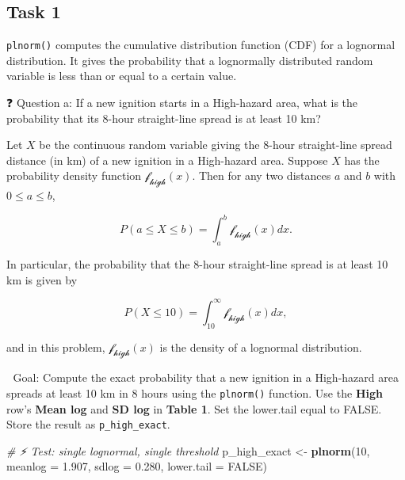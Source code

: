 \documentclass[
  12pt,
]{scrreprt}
\newenvironment{Shaded}{\begin{snugshade}}{\end{snugshade}}
\newcommand{\AttributeTok}[1]{\textcolor[rgb]{0.13,0.29,0.53}{#1}}
\newcommand{\CommentTok}[1]{\textcolor[rgb]{0.56,0.35,0.01}{\textit{#1}}}
\newcommand{\ConstantTok}[1]{\textcolor[rgb]{0.56,0.35,0.01}{#1}}
\newcommand{\DecValTok}[1]{\textcolor[rgb]{0.00,0.00,0.81}{#1}}
\newcommand{\FloatTok}[1]{\textcolor[rgb]{0.00,0.00,0.81}{#1}}
\newcommand{\FunctionTok}[1]{\textcolor[rgb]{0.13,0.29,0.53}{\textbf{#1}}}
\newcommand{\NormalTok}[1]{#1}
\newcommand{\OtherTok}[1]{\textcolor[rgb]{0.56,0.35,0.01}{#1}}
\begin{document}
\subsection{Task 1}\label{task-1-1}

\texttt{plnorm()} computes the cumulative distribution function (CDF) for a lognormal distribution. It gives the probability that a lognormally distributed random variable is less than or equal to a certain value.

❓ Question a: If a new ignition starts in a High-hazard area, what is the probability that its 8-hour straight-line spread is at least 10 km?

\begin{customtextbox}

Let $X$ be the continuous random variable giving the 8-hour straight-line spread distance (in km) of a new ignition in a High-hazard area. Suppose $X$ has the probability density function $\mathcal{f_{high}}(x)$. Then for any two distances $a$ and $b$ with $0 \leq a \leq b$,

$$ P(a \leq X \leq b) = \int_{a}^{b} \mathcal{f_{high}}(x) dx. $$ 

In particular, the probability that the 8-hour straight-line spread is at least 10 km is given by

$$ P(X \leq 10) = \int_{10}^{\infty} \mathcal{f_{high}}(x) dx, $$ 

and in this problem, $\mathcal{f_{high}}(x)$ is the density of a lognormal distribution. 

\end{customtextbox}

🎯 Goal: Compute the exact probability that a new ignition in a High-hazard area spreads at least 10 km in 8 hours using the \texttt{plnorm()} function. Use the \textbf{High} row's \textbf{Mean log} and \textbf{SD log} in \textbf{Table 1}. Set the lower.tail equal to FALSE. Store the result as \texttt{p\_high\_exact}.

\begin{Shaded}
\begin{Highlighting}[]
\CommentTok{\# ⚡ Test: single lognormal, single threshold}
\NormalTok{p\_high\_exact }\OtherTok{\textless{}{-}} \FunctionTok{plnorm}\NormalTok{(}\DecValTok{10}\NormalTok{, }\AttributeTok{meanlog =} \FloatTok{1.907}\NormalTok{, }\AttributeTok{sdlog =} \FloatTok{0.280}\NormalTok{, }\AttributeTok{lower.tail =} \ConstantTok{FALSE}\NormalTok{)}
\end{Highlighting}
\end{Shaded}
\end{document}

